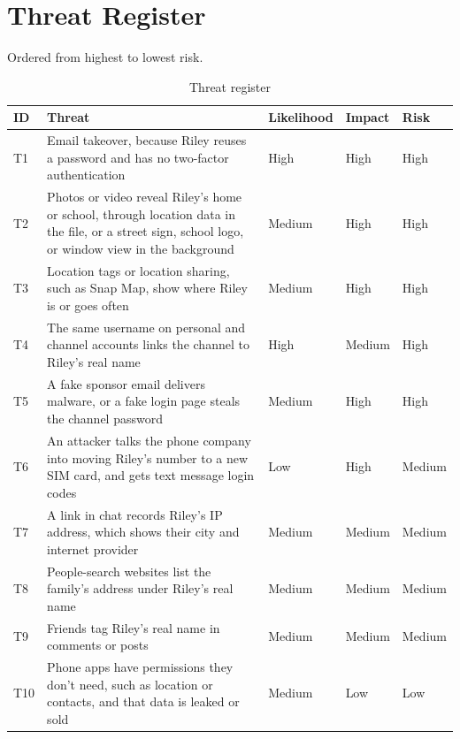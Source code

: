 \documentclass[11pt]{article}
\begin{document}
\section{Threat Register}
Ordered from highest to lowest risk.
\begin{table}[H]
\caption{Threat register}
\begin{tabular}{|m{}|m{}|m{}|m{}|m{}|}
\hline
\textbf{ID} & \textbf{Threat} & \textbf{Likeli\-hood} & \textbf{Impact} & \textbf{Risk} \\
\hline
T1 & Email takeover, because Riley reuses a password and has no two-factor authentication & High & High & High \\
\hline
T2 & Photos or video reveal Riley's home or school, through location data in the file, or a street sign, school logo, or window view in the background & Medium & High & High \\
\hline
T3 & Location tags or location sharing, such as Snap Map, show where Riley is or goes often & Medium & High & High \\
\hline
T4 & The same username on personal and channel accounts links the channel to Riley's real name & High & Medium & High \\
\hline
T5 & A fake sponsor email delivers malware, or a fake login page steals the channel password & Medium & High & High \\
\hline
T6 & An attacker talks the phone company into moving Riley's number to a new SIM card, and gets text message login codes & Low & High & Medium \\
\hline
T7 & A link in chat records Riley's IP address, which shows their city and internet provider & Medium & Medium & Medium \\
\hline
T8 & People-search websites list the family's address under Riley's real name & Medium & Medium & Medium \\
\hline
T9 & Friends tag Riley's real name in comments or posts & Medium & Medium & Medium \\
\hline
T10 & Phone apps have permissions they don't need, such as location or contacts, and that data is leaked or sold & Medium & Low & Low
\end{tabular}
\end{table}
\end{document}
